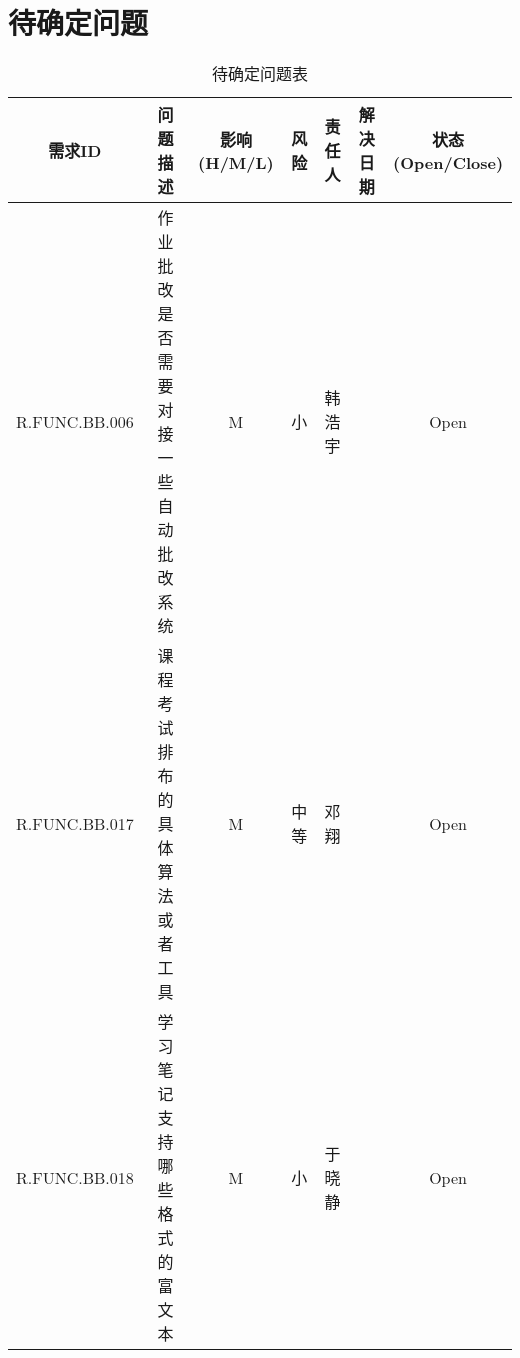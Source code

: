 \chapter{待确定问题}
\begin{table}[htbp]
\centering
\caption{待确定问题表}
\begin{tabular}{|c|c|c|c|c|c|c|}
    \hline
    需求ID & 问题描述 & 影响(H/M/L) & 风险 & 责任人 & 解决日期 & 状态(Open/Close) \\
    \hline
    R.FUNC.BB.006 & 作业批改是否需要对接一些自动批改系统 & M & 小 & 韩浩宇 &  & Open\\
    \hline
    R.FUNC.BB.017 & 课程考试排布的具体算法或者工具 & M & 中等 & 邓翔 &  & Open\\
    \hline
    R.FUNC.BB.018 & 学习笔记支持哪些格式的富文本 & M & 小 & 于晓静 &  & Open\\
    \hline
\end{tabular}
\end{table}
